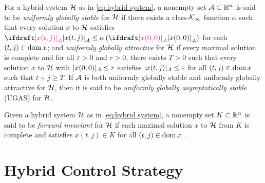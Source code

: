 \begin{definition}[{\cite[Definition 3.7]{sanfelice_hybrid_2021}}]%
    For a hybrid system \({\mathcal{H}}\) as in \cref{eq:hybrid system}, 
    a nonempty set \({\mathcal{A}} \subset \mathbb{R}^{n}\) is said to be
        \emph{uniformly globally stable} for \({\mathcal{H}}\) if there exists 
        a class-\({\mathcal{K}}_{\infty}\) function \(\alpha\) 
        such that every solution \(x\) to \({\mathcal{H}}\) satisfies 
        \(\distA{x(t, j)} \leq \alpha\left(\distA{x(0,0)}\right)\) 
        for each \((t, j) \in \operatorname{dom} x\); and
        \emph{uniformly globally attractive} for \({\mathcal{H}}\) if 
        every maximal solution is complete and
        for all \(\varepsilon>0\) and \(r>0\), there exists \(T>0\) such that
        every solution \(x\) to \({\mathcal{H}}\) with \(|x(0,0)|_{{\mathcal{A}}} \leq r\)
        satisfies $|x(t, j)|_{{\mathcal{A}}} \leq \varepsilon$ for all $(t, j) \in \operatorname{dom} x$
        such that $t+j \geq T$. If ${\mathcal{A}}$ is 
        both uniformly globally stable and uniformly globally attractive for ${\mathcal{H}}$,
        then it is said to be
        \emph{uniformly globally asymptotically stable} (UGAS) for \({\mathcal{H}}\).
\end{definition} 

Given a hybrid system \({\mathcal{H}}\) as in \cref{eq:hybrid system}, 
a nonempty set \(K \subset \mathbb{R}^{n}\) is said to be
\emph{forward invariant} for \({\mathcal{H}}\) if each maximal solution 
\(x\) to \({\mathcal{H}}\) from \(K\) is complete and satisfies 
\(x(t, j) \in K\) for all \((t, j) \in \operatorname{dom} x\)
\cite[Definition 3.13]{sanfelice_hybrid_2021}.

\section{Hybrid Control Strategy}
\label{sec:switching_logic}

